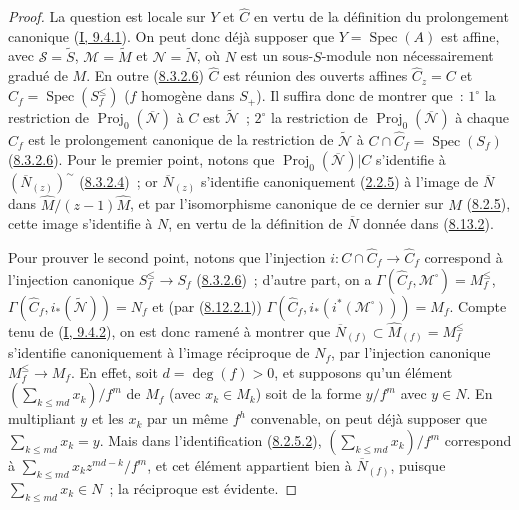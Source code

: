\begin{proof}
La question est locale sur $Y$ et $\widehat{C}$ en vertu de la définition du
prolongement canonique (\hyperref[I.9.4.1-fr]{I, 9.4.1}). On peut donc déjà
supposer que $Y=\operatorname{Spec}(A)$ est affine, avec
$\mathcal{S}=\widetilde{S}$, $\mathcal{M}=\widetilde{M}$ et
$\mathcal{N}=\widetilde{N}$, où $N$ est un sous-$S$-module non
nécessairement gradué de $M$. En outre
(\hyperref[II.8.3.2.6-fr]{8.3.2.6}) $\widehat{C}$ est réunion des ouverts
affines $\widehat{C}_z=C$ et
$\widehat{C}_f=\operatorname{Spec}(S_f^{\leq})$ ($f$ homogène dans $S_+$).
Il suffira donc de montrer que~: $1^\circ$ la restriction de
$\operatorname{Proj}_0(\overline{\mathcal{N}})$ à $C$ est
$\widetilde{\mathcal{N}}$~; $2^\circ$ la restriction de
$\operatorname{Proj}_0(\overline{\mathcal{N}})$ à chaque $\widehat{C}_f$ est
le prolongement canonique de la restriction de $\widetilde{\mathcal{N}}$ à
$C\cap\widehat{C}_f=\operatorname{Spec}(S_f)$
(\hyperref[II.8.3.2.6-fr]{8.3.2.6}). Pour le premier point, notons que
$\operatorname{Proj}_0(\overline{\mathcal{N}})|C$ s'identifie à
$(\overline{N}_{(z)})^{\sim}$
(\hyperref[II.8.3.2.4-fr]{8.3.2.4})~; or $\overline{N}_{(z)}$ s'identifie
canoniquement (\hyperref[II.2.2.5-fr]{2.2.5}) à l'image de
$\overline{N}$ dans $\widehat{M}/(z-1)\widehat{M}$, et par l'isomorphisme
canonique de ce dernier sur $M$ (\hyperref[II.8.2.5-fr]{8.2.5}), cette image
s'identifie à $N$, en vertu de la définition de $\overline{N}$ donnée dans
(\hyperref[II.8.13.2-fr]{8.13.2}).

Pour prouver le second point, notons que l'injection
$i:C\cap\widehat{C}_f\to\widehat{C}_f$ correspond à l'injection canonique
$S_f^{\leq}\to S_f$ (\hyperref[II.8.3.2.6-fr]{8.3.2.6})~; d'autre part, on
a $\Gamma(\widehat{C}_f,\mathcal{M}^{\square})=M_f^{\leq}$,
$\Gamma(\widehat{C}_f,i_*(\widetilde{\mathcal{N}}))=N_f$ et (par
(\hyperref[II.8.12.2.1-fr]{8.12.2.1}))
$\Gamma(\widehat{C}_f,i_*(i^*(\mathcal{M}^{\square})))=M_f$. Compte tenu de
(\hyperref[I.9.4.2-fr]{I, 9.4.2}), on est donc ramené à montrer que
$\overline{N}_{(f)}\subset\widehat{M}_{(f)}=M_f^{\leq}$ s'identifie
canoniquement à l'image réciproque de $N_f$, par l'injection canonique
$M_f^{\leq}\to M_f$. En effet, soit $d=\deg(f)>0$, et supposons qu'un
élément $(\sum_{k\leqslant md}x_k)/f^m$ de $M_f$ (avec $x_k\in M_k$) soit de
la forme $y/f^m$ avec $y\in N$. En multipliant $y$ et les $x_k$ par un même
$f^h$ convenable, on peut déjà supposer que $\sum_{k\leqslant md}x_k=y$.
Mais dans l'identification (\hyperref[II.8.2.5.2-fr]{8.2.5.2}),
$(\sum_{k\leqslant md}x_k)/f^m$ correspond à
$\sum_{k\leqslant md}x_kz^{md-k}/f^m$, et cet élément appartient bien à
$\overline{N}_{(f)}$, puisque $\sum_{k\leqslant md}x_k\in N$~; la réciproque
est évidente.
\end{proof}


